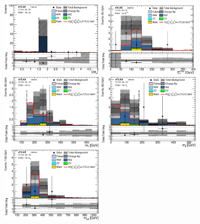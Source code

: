 \begin{figure}[htbp]
\centering
\includegraphics[width=0.45\textwidth]{data/plot/PlotsN1/all_DEtall_SRjet1_NoDEtall.eps}
\includegraphics[width=0.45\textwidth]{data/plot/PlotsN1/all_Met_SRjet1_NoMet.eps} \\
\includegraphics[width=0.45\textwidth]{data/plot/PlotsN1/all_Mt_SRjet1_NoMt.eps}
\includegraphics[width=0.45\textwidth]{data/plot/PlotsN1/all_Mlj_SRjet1_NoMlj.eps} \\
\includegraphics[width=0.45\textwidth]{data/plot/PlotsN1/all_Meff_SRjet1_NoMeff.eps}

\end{figure}
